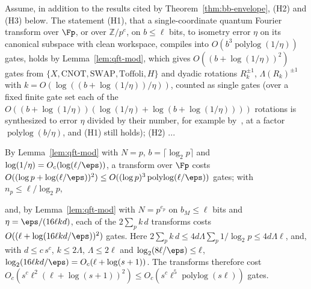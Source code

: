 
Assume, in addition to the results cited by Theorem~\ref{thm:bb-envelope}, \textup{(H2)} and \textup{(H3)} below. The statement \textup{(H1)}, that a single-coordinate quantum Fourier transform over $\Fp$, or over $\mathbb{Z}/p^e$, on $b \le \ell$ bits, to isometry error $\eta$ on its canonical subspace with clean workspace, compiles into $O(b^3\operatorname{polylog}(1/\eta))$ gates, holds by Lemma~\ref{lem:qft-mod}, which gives $O((b + \log(1/\eta))^2)$ gates from $\{X,\mathrm{CNOT},\mathrm{SWAP},\mathrm{Toffoli},H\}$ and dyadic rotations $R_k^{\pm1}$, $\Lambda(R_k)^{\pm1}$ with $k = O(\log((b + \log(1/\eta))/\eta))$, counted as single gates (over a fixed finite gate set each of the $O((b+\log(1/\eta))(\log(1/\eta) + \log(b+\log(1/\eta))))$ rotations is synthesized to error $\eta$ divided by their number, for example by~\cite{DawsonNielsen2006}, at a factor $\operatorname{polylog}(b/\eta)$, and (H1) still holds); \textup{(H2)} ...

By Lemma~\ref{lem:qft-mod} with $N = p$, $b = \lceil\log_2 p\rceil$ and $\log(1/\eta) = O_c(\log(\ell/\eps))$, a transform over $\Fp$ costs $O((\log p + \log(\ell/\eps))^2) \le O((\log p)^3\operatorname{polylog}(\ell/\eps))$ gates; with $n_p \le \ell/\log_2 p$,

and, by Lemma~\ref{lem:qft-mod} with $N = p^{e_p}$ on $b_M \le \ell$ bits and $\eta = \eps/(16\ell kd)$, each of the $2\sum_p k\,d$ transforms costs $O((\ell + \log(16\ell kd/\eps))^2)$ gates. Here $2\sum_p k\,d \le 4d\Lambda\sum_p 1/\log_2 p \le 4d\Lambda\ell$, and, with $d \le c\,s^c$, $k \le 2\Lambda$, $\Lambda \le 2\ell$ and $\log_2(8\ell/\eps) \le \ell$, $\log_2(16\ell kd/\eps) = O_c(\ell + \log(s+1))$. The transforms therefore cost $O_c(s^c\ell^2(\ell + \log(s+1))^2) \le O_c(s^c\ell^5\operatorname{polylog}(s\ell))$ gates.

